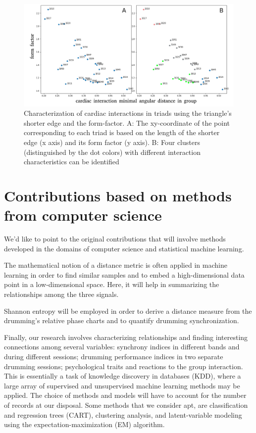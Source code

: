 \documentclass[a4paper, 11pt]{report}      %
\begin{document}
\begin{figure}
    \centering
    \includegraphics[scale=0.35]{coupling_clusters_and_original_sbs.png}
    \caption{Characterization of cardiac interactions in triads using the triangle's shorter edge and the form-factor. A: The xy-coordinate of the point corresponding to each triad is based on the length of the shorter edge (x axis) and its form factor (y axis). B: Four clusters (distinguished by the dot colors) with different interaction characteristics can be identified }
    \label{fig:formfactor}
\end{figure}

\section{Contributions based on methods from computer science}
We'd like to point to the original contributions that will involve methods developed in the domains of computer science and statistical machine learning.

The mathematical notion of a distance metric is often applied in machine learning in order to find similar samples and to embed a high-dimensional data point in a low-dimensional space. Here, it will help in summarizing the relationships among the three signals.

Shannon entropy will be employed in order to derive a distance measure from the drumming's relative phase charts and to quantify drumming synchronization.

Finally, our research involves characterizing relationships and finding interesting connections among several variables: synchrony indices in different bands and during different sessions; drumming performance indices in two separate drumming sessions; psychological traits and reactions to the group interaction. This is essentially a task of knowledge discovery in databases (KDD), where a large array of supervised and unsupervised machine learning methods may be applied. The choice of methods and models  will have to account for the number of records at our disposal. Some methods that we consider apt, are classification and regression trees (CART), clustering analysis, and latent-variable modeling using the expectation-maximization (EM) algorithm.
\end{document}

